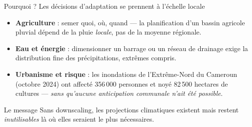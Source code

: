 \documentclass[aspectratio=169,10pt]{beamer}
\begin{document}
\begin{frame}{Pourquoi ? Les décisions d'adaptation se prennent à l'échelle locale}
  \begin{itemize}
    \item \textbf{Agriculture} : semer quoi, où, quand --- la planification d'un bassin
          agricole pluvial dépend de la pluie \emph{locale}, pas de la moyenne régionale.
    \item \textbf{Eau et énergie} : dimensionner un barrage ou un réseau de drainage
          exige la distribution fine des précipitations, extrêmes compris.
    \item \textbf{Urbanisme et risque} : les inondations de l'Extrême-Nord du Cameroun
          (octobre 2024) ont affecté \alert{356\,000 personnes} et noyé
          \alert{82\,500 hectares} de cultures --- \emph{sans qu'aucune anticipation
          communale n'ait été possible}.
  \end{itemize}
  \vspace{0.2cm}
  \begin{alertblock}{Le message}
    Sans downscaling, les projections climatiques existent mais restent
    \emph{inutilisables} là où elles seraient le plus nécessaires.
  \end{alertblock}
\end{frame}
\end{document}
